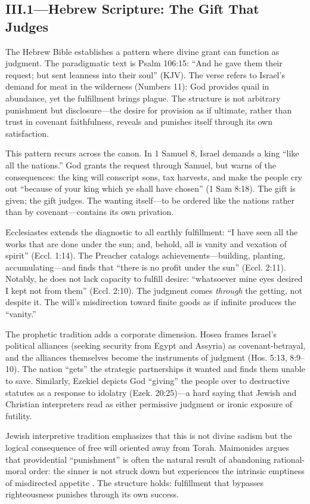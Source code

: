 \subsection*{III.1—Hebrew Scripture: The Gift That Judges}
\label{ssec:iii-hebrew-scripture}

The Hebrew Bible establishes a pattern where divine grant can function as judgment. The
paradigmatic text is Psalm 106:15: ``And he gave them their request; but sent leanness into
their soul'' (KJV). The verse refers to Israel's demand for meat in the wilderness (Numbers
11): God provides quail in abundance, yet the fulfillment brings plague. The structure is not
arbitrary punishment but disclosure---the desire for provision as if ultimate, rather than
trust in covenant faithfulness, reveals and punishes itself through its own satisfaction.

This pattern recurs across the canon. In 1 Samuel 8, Israel demands a king ``like all the
nations.'' God grants the request through Samuel, but warns of the consequences: the king will
conscript sons, tax harvests, and make the people cry out ``because of your king which ye
shall have chosen'' (1 Sam 8:18). The gift is given; the gift judges. The wanting itself---to
be ordered like the nations rather than by covenant---contains its own privation.

Ecclesiastes extends the diagnostic to all earthly fulfillment: ``I have seen all the works
that are done under the sun; and, behold, all is vanity and vexation of spirit'' (Eccl. 1:14).
The Preacher catalogs achievements---building, planting, accumulating---and finds that ``there
is no profit under the sun'' (Eccl. 2:11). Notably, he does not lack capacity to fulfill
desire: ``whatsoever mine eyes desired I kept not from them'' (Eccl. 2:10). The judgment comes
\emph{through} the getting, not despite it. The will's misdirection toward finite goods as if
infinite produces the ``vanity.''

The prophetic tradition adds a corporate dimension. Hosea frames Israel's political alliances
(seeking security from Egypt and Assyria) as covenant-betrayal, and the alliances themselves
become the instruments of judgment (Hos. 5:13, 8:9--10). The nation ``gets'' the strategic
partnerships it wanted and finds them unable to save. Similarly, Ezekiel depicts God
``giving'' the people over to destructive statutes as a response to idolatry (Ezek. 20:25)---a
hard saying that Jewish and Christian interpreters read as either permissive judgment or
ironic exposure of futility.

Jewish interpretive tradition emphasizes that this is not divine sadism but the logical
consequence of free will oriented away from Torah. Maimonides argues that providential
``punishment'' is often the natural result of abandoning rational-moral order: the sinner is
not struck down but experiences the intrinsic emptiness of misdirected appetite
\parencite{MaimonidesGuide1963}. The structure holds: fulfillment that bypasses righteousness
punishes through its own success.
